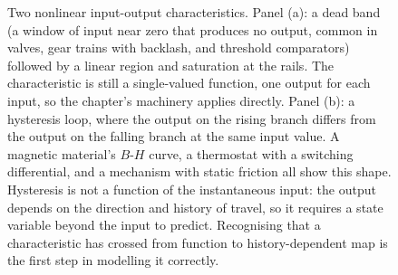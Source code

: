 \begin{figure}[htbp]
{\begin{tikzpicture}
\end{tikzpicture}%
}%
\caption[Dead band, saturation, and hysteresis]{Two nonlinear
input-output characteristics. Panel (a): a dead band (a window of
input near zero that produces no output, common in valves, gear
trains with backlash, and threshold comparators) followed by a linear
region and saturation at the rails. The characteristic is still a
single-valued function, one output for each input, so the chapter's
machinery applies directly. Panel (b): a hysteresis loop, where the
output on the rising branch differs from the output on the falling
branch at the same input value. A magnetic material's $B$-$H$ curve,
a thermostat with a switching differential, and a mechanism with
static friction all show this shape. Hysteresis is not a function of
the instantaneous input: the output depends on the direction and
history of travel, so it requires a state variable beyond the input
to predict. Recognising that a characteristic has crossed from
function to history-dependent map is the first step in modelling it
correctly.}
\label{fig:vol02:ch02:hysteresis-deadband}
\end{figure}
